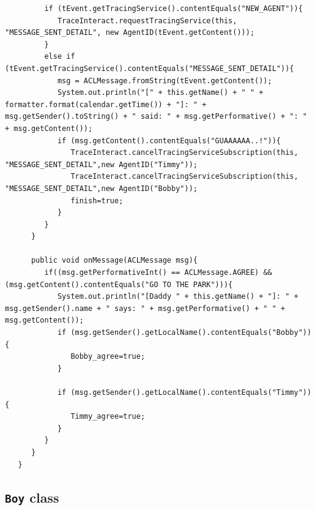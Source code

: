 \begin{lstlisting}
         if (tEvent.getTracingService().contentEquals("NEW_AGENT")){
            TraceInteract.requestTracingService(this, "MESSAGE_SENT_DETAIL", new AgentID(tEvent.getContent()));
         }
         else if (tEvent.getTracingService().contentEquals("MESSAGE_SENT_DETAIL")){
            msg = ACLMessage.fromString(tEvent.getContent());
            System.out.println("[" + this.getName() + " " + formatter.format(calendar.getTime()) + "]: " + msg.getSender().toString() + " said: " + msg.getPerformative() + ": " + msg.getContent());
            if (msg.getContent().contentEquals("GUAAAAAA..!")){
               TraceInteract.cancelTracingServiceSubscription(this, "MESSAGE_SENT_DETAIL",new AgentID("Timmy"));
               TraceInteract.cancelTracingServiceSubscription(this, "MESSAGE_SENT_DETAIL",new AgentID("Bobby"));
               finish=true;
            }
         }
      }

      public void onMessage(ACLMessage msg){
         if((msg.getPerformativeInt() == ACLMessage.AGREE) && (msg.getContent().contentEquals("GO TO THE PARK"))){
            System.out.println("[Daddy " + this.getName() + "]: " + msg.getSender().name + " says: " + msg.getPerformative() + " " + msg.getContent());
            if (msg.getSender().getLocalName().contentEquals("Bobby")){
               Bobby_agree=true;
            }

            if (msg.getSender().getLocalName().contentEquals("Timmy")){
               Timmy_agree=true;
            }
         }
      }
   }
		\end{lstlisting}

	\subsection{\texttt{Boy} class}\label{sec:boy}


